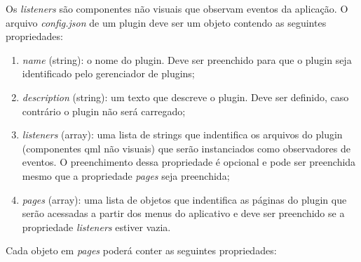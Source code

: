 Os \textit{listeners} são componentes não visuais que observam eventos da aplicação. O arquivo \textit{config.json} de um plugin deve ser um objeto contendo as seguintes propriedades:

\begin{enumerate}
	\item \textit{name} (string): o nome do plugin. Deve ser preenchido para que o plugin seja identificado pelo gerenciador de plugins;

	\item \textit{description} (string): um texto que descreve o plugin. Deve ser definido, caso contrário o plugin não será carregado;

	\item \textit{listeners} (array): uma lista de strings que indentifica os arquivos do plugin (componentes qml não visuais) que serão instanciados como observadores de eventos. O preenchimento dessa propriedade é opcional e pode ser preenchida mesmo que a propriedade \textit{pages} seja preenchida;

	\item \textit{pages} (array): uma lista de objetos que indentifica as páginas do plugin que serão acessadas a partir dos menus do aplicativo e deve ser preenchido se a propriedade \textit{listeners} estiver vazia.
\end{enumerate}

Cada objeto em \textit{pages} poderá conter as seguintes propriedades:

